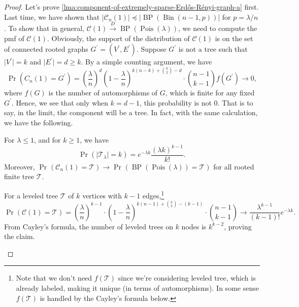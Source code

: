 \begin{proof}
	Let's prove \autoref{lma:component-of-extremely-sparse-Erdős-Rényi-graph-a} first. Last time, we have shown that \(\lvert \mathcal{C} _n(1) \rvert \preceq \lvert \operatorname{BP} (\operatorname{Bin}(n-1, p) )\rvert \) for \(p = \lambda /n\). To show that in general, \(\mathcal{C} (1) \overset{D}{\to} \operatorname{BP}(\operatorname{Pois}(\lambda ) ) \), we need to compute the pmf of \(\mathcal{C} (1)\). Obviously, the support of the distribution of \(\mathcal{C} (1)\) is on the set of connected rooted graphs \(G^{\prime}  = (V^{\prime} , E^{\prime} )\). Suppose \(G^{\prime} \) is not a tree such that \(\lvert V^{\prime} \rvert = k\) and \(\lvert E^{\prime} \rvert = d \geq k\). By a simple counting argument, we have
	\[
		\Pr_{}(C_n(1) = G^{\prime} )
		= \left( \frac{\lambda }{n} \right) ^d \left( 1 - \frac{\lambda}{n} \right) ^{k (n-k) + \binom{k}{2} - d} \cdot \binom{n-1}{k-1} f(G^{\prime} )
		\to 0,
	\]
	where \(f(G)\) is the number of automorphisms of \(G\), which is finite for any fixed \(G^{\prime} \). Hence, we see that only when \(k = d-1\), this probability is not \(0\). That is to say, in the limit, the component will be a tree. In fact, with the same calculation, we have the following.

	\begin{claim}
		For \(\lambda \leq 1\), and for \(k \geq 1\), we have
		\[
			\Pr_{}(\lvert \mathcal{T} _\lambda \rvert = k)
			= e^{-\lambda k} \frac{(\lambda k)^{k-1}}{k!}.
		\]
		Moreover, \(\Pr_{}(\mathcal{C} _n(1) = \mathcal{T} ) \to \Pr_{}(\operatorname{BP}(\operatorname{Pois}(\lambda ) ) = \mathcal{T} ) \) for all rooted finite tree \(\mathcal{T} \).
	\end{claim}
	\begin{explanation}
		For a leveled tree \(\mathcal{T} \) of \(k\) vertices with \(k-1\) edges,\footnote{Note that we don't need \(f(\mathcal{T} )\) since we're considering leveled tree, which is already labeled, making it unique (in terms of automorphisms). In some sense \(f(\mathcal{T} )\) is handled by the Cayley's formula below.}
		\[
			\Pr_{}(\mathcal{C} (1) = \mathcal{T} )
			= \left( \frac{\lambda}{n} \right) ^{k-1} \cdot \left( 1 - \frac{\lambda}{n} \right) ^{k(n-1) + \binom{k}{2}  - (k-1)} \cdot \binom{n-1}{k-1}
			\to \frac{\lambda ^{k-1}}{(k-1)!} e^{-\lambda k}.
		\]
		From Cayley's formula, the number of leveled trees on \(k\) nodes is \(k^{k-2}\), proving the claim.
	\end{explanation}


\end{proof}
